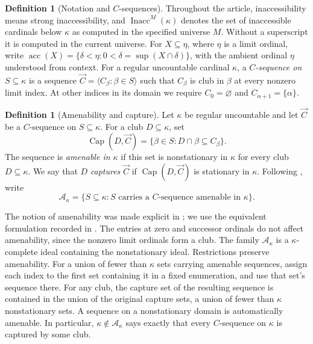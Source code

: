 \documentclass[10pt,a4paper]{amsart}
\theoremstyle{definition}
\newtheorem{definition}[theorem]{Definition}
\theoremstyle{remark}
\newcommand{\A}{\mathcal A}
\DeclareMathOperator{\Inacc}{Inacc}
\DeclareMathOperator{\acc}{acc}
\begin{document}
\begin{definition}[Notation and \(C\)-sequences]\label{def:c-sequence}
Throughout the article, inaccessibility means strong
inaccessibility, and \(\Inacc^M(\kappa)\) denotes the set of
inaccessible cardinals below \(\kappa\) as computed in the
specified universe \(M\). Without a superscript it is computed
in the current universe. For \(X\subseteq\eta\), where
\(\eta\) is a limit ordinal, write
\(\acc(X)=\{\delta<\eta:0<\delta=\sup(X\cap\delta)\}\),
with the ambient ordinal \(\eta\) understood from context.
For a regular uncountable cardinal \(\kappa\), a
\emph{\(C\)-sequence on \(S\subseteq\kappa\)} is a sequence
\(\vec C=\langle C_\beta:\beta\in S\rangle\) such that
\(C_\beta\) is club in \(\beta\) at every nonzero limit
index. At other indices in its domain we require
\(C_0=\varnothing\) and \(C_{\alpha+1}=\{\alpha\}\).
\end{definition}

\begin{definition}[Amenability and capture]
\label{def:amenability}
Let \(\kappa\) be regular uncountable and let \(\vec C\) be a
\(C\)-sequence on \(S\subseteq\kappa\). For a club
\(D\subseteq\kappa\), set
\[
 \operatorname{Cap}(D,\vec C)
   =\{\beta\in S:D\cap\beta\subseteq C_\beta\}.
\]
The sequence is \emph{amenable in \(\kappa\)} if this set is
nonstationary in \(\kappa\) for every club \(D\subseteq\kappa\).
We say that \(D\) \emph{captures} \(\vec C\) if
\(\operatorname{Cap}(D,\vec C)\) is stationary in \(\kappa\).
Following \cite[Definitions 4.1 and 4.3]{IR}, write
\[
 \A_\kappa
   =\{S\subseteq\kappa:S\text{ carries a \(C\)-sequence
                         amenable in \(\kappa\)}\}.
\]
\end{definition}

The notion of amenability was made explicit in \cite{BR};
we use the equivalent formulation recorded in
\cite[Definition 4.1 and Fact 4.2]{IR}.
The entries at zero and successor ordinals do not affect
amenability, since the nonzero limit ordinals form a club.
The family \(\A_\kappa\) is a \(\kappa\)-complete ideal
containing the nonstationary ideal. Restrictions preserve
amenability. For a union of fewer than \(\kappa\) sets carrying
amenable sequences, assign each index to the first set
containing it in a fixed enumeration, and use that set's
sequence there. For any club, the capture set of the resulting
sequence is contained in the union of the original capture
sets, a union of fewer than \(\kappa\) nonstationary sets.
A sequence on a nonstationary domain is automatically amenable.
In particular, \(\kappa\notin\A_\kappa\) says exactly that
every \(C\)-sequence on \(\kappa\) is captured by some club.
\end{document}
